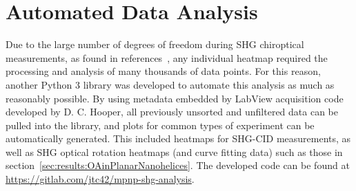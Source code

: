 \section{Automated Data Analysis}\label{sec:appendix:pyshg}
Due to the large number of degrees of freedom during SHG chiroptical measurements, as found in references~\cite{Collins2018b, Hooper2017}, any individual heatmap required the processing and analysis of many thousands of data points. For this reason, another Python 3 library was developed to automate this analysis as much as reasonably possible. By using metadata embedded by LabView acquisition code developed by D. C. Hooper, all previously unsorted and unfiltered data can be pulled into the library, and plots for common types of experiment can be automatically generated. This included heatmaps for SHG-CID measurements, as well as SHG optical rotation heatmaps (and curve fitting data) such as those in section~\ref{sec:results:OAinPlanarNanohelices}.
The developed code can be found at \url{https://gitlab.com/jtc42/mpnp-shg-analysis}.